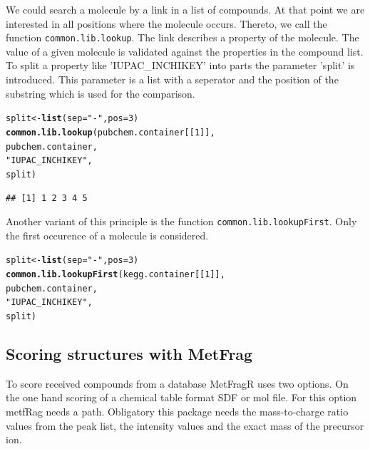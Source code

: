 \documentclass[12pt, a4paper]{scrartcl}\usepackage[]{graphicx}\usepackage[]{color}
\makeatletter
\newcommand{\hlnum}[1]{\textcolor[rgb]{0.686,0.059,0.569}{#1}}%
\newcommand{\hlstr}[1]{\textcolor[rgb]{0.192,0.494,0.8}{#1}}%
\newcommand{\hlstd}[1]{\textcolor[rgb]{0.345,0.345,0.345}{#1}}%
\newcommand{\hlkwb}[1]{\textcolor[rgb]{0.69,0.353,0.396}{#1}}%
\newcommand{\hlkwc}[1]{\textcolor[rgb]{0.333,0.667,0.333}{#1}}%
\newcommand{\hlkwd}[1]{\textcolor[rgb]{0.737,0.353,0.396}{\textbf{#1}}}%
\newenvironment{kframe}{%
 \def\at@end@of@kframe{}%
 \ifinner\ifhmode%
  \def\at@end@of@kframe{\end{minipage}}%
  \begin{minipage}{\columnwidth}%
 \fi\fi%
 \def\FrameCommand##1{\hskip\@totalleftmargin \hskip-\fboxsep
 \colorbox{shadecolor}{##1}\hskip-\fboxsep
     \hskip-\linewidth \hskip-\@totalleftmargin \hskip\columnwidth}%
 \MakeFramed {\advance\hsize-\width
   \@totalleftmargin\z@ \linewidth\hsize
   \@setminipage}}%
 {\par\unskip\endMakeFramed%
 \at@end@of@kframe}
\newenvironment{knitrout}{}{} %
\newcommand{\Rfunction}[1]{{\texttt{#1}}}
\makeatother
\begin{document}
We could search a molecule by a link in a list of compounds. At that point we are interested in all positions where
the molecule occurs. 
Thereto, we call the function \Rfunction{common.lib.lookup}. The link describes a property of the molecule. The value of a given molecule is validated against the properties in the compound list. To split a property like 'IUPAC\_INCHIKEY' into parts the parameter 'split' is introduced. This parameter is a list with a seperator and the position of the substring which is used for the comparison.

\begin{knitrout}
\color{fgcolor}\begin{kframe}
\begin{alltt}
  \hlstd{split} \hlkwb{<-} \hlkwd{list}\hlstd{(}\hlkwc{sep}\hlstd{=}\hlstr{"-"}\hlstd{,} \hlkwc{pos}\hlstd{=}\hlnum{3}\hlstd{)}
  \hlkwd{common.lib.lookup}\hlstd{(pubchem.container[[}\hlnum{1}\hlstd{]],}
                    \hlstd{pubchem.container,}
                    \hlstr{"IUPAC_INCHIKEY"}\hlstd{,}
                    \hlstd{split)}
\end{alltt}
\begin{verbatim}
## [1] 1 2 3 4 5
\end{verbatim}
\end{kframe}
\end{knitrout}

Another variant of this principle is the function \Rfunction{common.lib.lookupFirst}. Only the first occurence of a molecule is considered.

\begin{knitrout}
\color{fgcolor}\begin{kframe}
\begin{alltt}
  \hlstd{split} \hlkwb{<-} \hlkwd{list}\hlstd{(}\hlkwc{sep}\hlstd{=}\hlstr{"-"}\hlstd{,} \hlkwc{pos}\hlstd{=}\hlnum{3}\hlstd{)}
  \hlkwd{common.lib.lookupFirst}\hlstd{(kegg.container[[}\hlnum{1}\hlstd{]],}
                         \hlstd{pubchem.container,}
                         \hlstr{"IUPAC_INCHIKEY"}\hlstd{,}
                         \hlstd{split)}
\end{alltt}
\end{kframe}
\end{knitrout}

\newpage
\subsection{Scoring structures with MetFrag}
To score received compounds from a database MetFragR uses two options. On the one hand scoring of a chemical table format SDF or mol file. For this option metfRag needs a path. Obligatory this package needs the mass-to-charge ratio values from the peak list, the intensity values and the exact mass of the 
precursor ion. 
\end{document}

